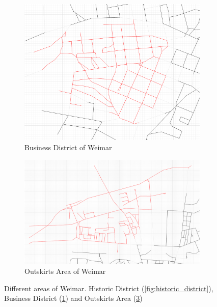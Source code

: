\documentclass[11pt, a4paper]{report}
\begin{document}
\begin{figure}
\begin{subfigure}[b]{0.6\textwidth}
\begin{mdframed}[style=mdthight]
            \includegraphics[width=\linewidth]{business_district.png}
        \end{mdframed}
        \caption{Business District of Weimar}
        \label{fig:business_district}
    \end{subfigure}
    \begin{subfigure}[b]{0.6\textwidth}
        \begin{mdframed}[style=mdthight]
            \includegraphics[width=\linewidth]{outskirts_district.png}
        \end{mdframed}
        \caption{Outskirts Area of Weimar}
        \label{fig:outskirts_district}
    \end{subfigure}
    \caption{Different areas of Weimar. Historic District (\ref{fig:historic_district}), Business District (\ref{fig:business_district}) and Outskirts Area (\ref{fig:outskirts_district})}
\end{figure}
\end{document}
